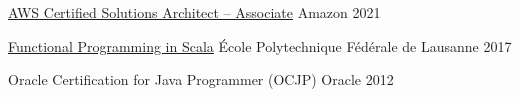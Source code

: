 





\begin{cventries}

    \cventry
    {\href{https://www.credly.com/badges/e5761b98-edf5-44ec-bb32-24f18672e7de/public_url}{AWS Certified Solutions Architect – Associate}}
    {\hspace{0.5em}Amazon} %
    {}
    {2021}
    {}
    {}
    {}

    \cventry
    {\href{https://www.coursera.org/account/accomplishments/specialization/9NNUCHVNV36F}{Functional Programming in Scala}}
    {\hspace{0.5em}École Polytechnique Fédérale de Lausanne} %
    {}
    {2017}
    {}
    {}
    {}

    \cventry
    {Oracle Certification for Java Programmer (OCJP)} %
    {\hspace{0.5em}Oracle} %
    {}
    {2012} %
    {}
    {}
    {}


\end{cventries}

